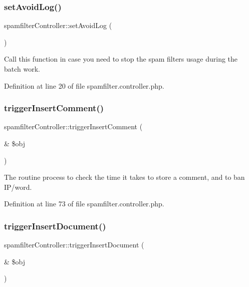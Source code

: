 \subsubsection{\texorpdfstring{set\+Avoid\+Log()}{setAvoidLog()}}
{\footnotesize\ttfamily spamfilter\+Controller\+::set\+Avoid\+Log (\begin{DoxyParamCaption}{ }\end{DoxyParamCaption})}



Call this function in case you need to stop the spam filter\textquotesingle{}s usage during the batch work. 



Definition at line 20 of file spamfilter.\+controller.\+php.

\hypertarget{classspamfilterController_ac01aa63960909cc5c95bfae15ded5d99}{}\label{classspamfilterController_ac01aa63960909cc5c95bfae15ded5d99} 
\subsubsection{\texorpdfstring{trigger\+Insert\+Comment()}{triggerInsertComment()}}
{\footnotesize\ttfamily spamfilter\+Controller\+::trigger\+Insert\+Comment (\begin{DoxyParamCaption}\item[{\&}]{\$obj }\end{DoxyParamCaption})}



The routine process to check the time it takes to store a comment, and to ban I\+P/word. 



Definition at line 73 of file spamfilter.\+controller.\+php.

\hypertarget{classspamfilterController_a9ed78c37a603b06cb067ecdc523a2ae4}{}\label{classspamfilterController_a9ed78c37a603b06cb067ecdc523a2ae4} 
\subsubsection{\texorpdfstring{trigger\+Insert\+Document()}{triggerInsertDocument()}}
{\footnotesize\ttfamily spamfilter\+Controller\+::trigger\+Insert\+Document (\begin{DoxyParamCaption}\item[{\&}]{\$obj }\end{DoxyParamCaption})}



